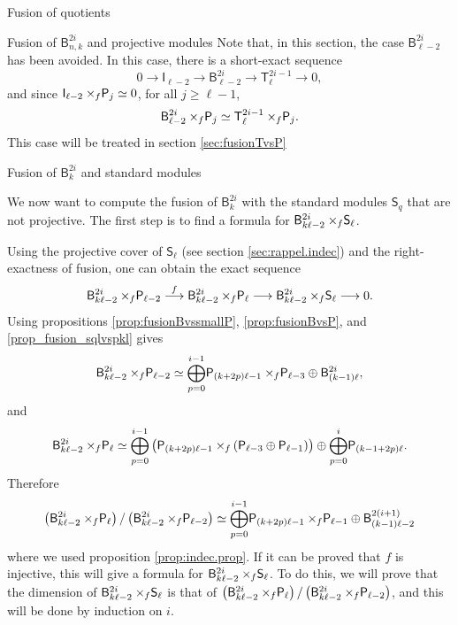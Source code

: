 \documentclass[reqno]{amsart}
\newcommand{\ds}[1]{\mathsf S_{#1}}
\newcommand{\dl}[1]{\mathsf I_{#1}}
\newcommand{\dP}[1]{\mathsf P_{#1}}
\newcommand{\xf}{\times\hspace{-0.27em}_f}
\newcommand{\T}[2]{\mathsf{T}^{#1}_{#2}}
\newcommand{\B}[2]{\mathsf{B}^{#1}_{#2}}
\newcommand{\lc}{\ell}
\begin{document}
\begin{section}{Fusion of quotients}
\begin{subsection}{Fusion of $\B{2i}{n,k}$ and projective modules}
Note that, in this section, the case $\B{2i}{\lc -2}$ has been avoided. In this case, there is a short-exact sequence
\begin{equation*}
	0 \longrightarrow \dl{\lc-2} \longrightarrow \B{2i}{\lc-2} \longrightarrow \T{2i-1}{\lc} \longrightarrow 0,
\end{equation*}
and since $\dl{\lc -2} \xf \dP{j} \simeq 0 $, for all $j\geq \lc-1 $, $$\B{2i}{\lc-2} \xf \dP{j} \simeq \T{2i-1}{\lc} \xf \dP{j}.$$ This case will be treated in section \ref{sec:fusionTvsP}
\end{subsection}
\begin{subsection}{Fusion of $\B{2i}{k}$ and standard modules}\label{sec:fusionBvsS}


We now want to compute the fusion of $\B{2i}{k}$ with the standard modules $\ds{q}$ that are not projective. The first step is to find a formula for $\B{2i}{k\lc -2}\xf \ds{\lc}$. 


Using the projective cover of $\ds{\lc}$ (see section \ref{sec:rappel.indec}) and the right-exactness of fusion, one can obtain the exact sequence
\begin{equation}\label{eq:fusionBvsS.1}
	\B{2i}{k\lc -2} \xf \dP{\lc-2} \overset{f}{\longrightarrow} \B{2i}{k \lc -2} \xf \dP{\lc} \longrightarrow \B{2i}{k \lc -2} \xf \ds{\lc} \longrightarrow 0.
\end{equation}
Using propositions \ref{prop:fusionBvssmallP}, \ref{prop:fusionBvsP}, and \ref{prop_fusion_sqlvspkl} gives
\begin{equation*}
	\B{2i}{k\lc -2} \xf \dP{\lc-2} \simeq \overset{i-1}{\underset{p = 0}{\bigoplus}}\dP{(k+2p)\lc-1} \xf \dP{\lc-3} \oplus \B{2i}{(k-1)\lc},
\end{equation*}
and
\begin{equation*}
	\B{2i}{k\lc -2} \xf \dP{\lc} \simeq \overset{i-1}{\underset{p = 0}{\bigoplus}}\left(\dP{(k+2p)\lc-1} \xf \left(\dP{\lc-3} \oplus \dP{\lc-1}\right)\right) \oplus \overset{i}{\underset{p = 0}{\bigoplus}}\dP{(k-1+2p)\lc}.
\end{equation*}
Therefore
\begin{equation*}
 \left(\B{2i}{k\lc -2} \xf \dP{\lc}\right)/ \left( \B{2i}{k\lc -2} \xf \dP{\lc-2} \right) \simeq \overset{i-1}{\underset{p = 0}{\bigoplus}}\dP{(k+2p)\lc-1} \xf \dP{\lc-1} \oplus \B{2(i+1)}{(k-1)\lc-2}
\end{equation*}
where we used proposition \ref{prop:indec.prop}. If it can be proved that $f$ is injective, this will give a formula for $\B{2i}{k \lc -2} \xf \ds{\lc}$. To do this, we will prove that the dimension of $\B{2i}{k \lc -2} \xf \ds{\lc}$ is that of $\left(\B{2i}{k\lc -2} \xf \dP{\lc}\right)/ \left( \B{2i}{k\lc -2} \xf \dP{\lc-2} \right)$, and this will be done by induction on $i$.
 

\end{subsection}
\end{section}
\end{document}
